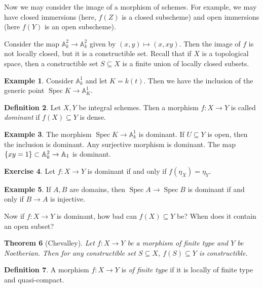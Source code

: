 \documentclass[leqno, openany]{memoir}
\newtheorem{thm}{Theorem}[section]
\theoremstyle{definition}
\newtheorem{defn}[thm]{Definition}
\newtheorem{exm}[thm]{Example}
\newtheorem{exer}[thm]{Exercise}
\theoremstyle{remark}
\theoremstyle{plain}
\theoremstyle{definition}
\theoremstyle{remark}
\newcommand{\A}{\mathbb{A}}
\DeclareMathOperator{\Spec}{Spec}
\begin{document}
Now we may consider the image of a morphism of schemes. For example, we may have closed immersions (here, $f(Z)$ is a closed subscheme) and open immersions (here $f(Y)$ is an open subscheme).

Consider the map $\A^2_k \to \A^2_k$ given by $(x,y) \mapsto (x, xy)$. Then the image of $f$ is not locally closed, but it is a constructible set. Recall that if $X$ is a topological space, then a constructible set $S \subseteq X$ is a finite union of locally closed subsets.

\begin{exm}
    Consider $\A^1_k$ and let $K = k(t)$. Then we have the inclusion of the generic point $\Spec K \to \A^1_K$.
\end{exm}

\begin{defn}
    Let $X,Y$ be integral schemes. Then a morphism $f \colon X \to Y$ is called \textit{dominant} if $f(X) \subseteq Y$ is dense.
\end{defn}

\begin{exm}
    The morphism $\Spec K \to \A^1_k$ is dominant. If $U \subseteq Y$ is open, then the inclusion is dominant. Any surjective morphism is dominant. The map $\qty{xy = 1} \subset \A^2_k \to \A_1$ is dominant.
\end{exm}

\begin{exer}
    Let $f \colon X \to Y$ is dominant if and only if $f(\eta_X) = \eta_Y$.
\end{exer}

\begin{exm}
    If $A, B$ are domains, then $\Spec A \to \Spec B$ is dominant if and only if $B \to A$ is injective.
\end{exm}

Now if $f \colon X \to Y$ is dominant, how bad can $f(X) \subseteq Y$ be? When does it contain an open subset?

\begin{thm}[Chevalley]
    Let $f \colon X \to Y$ be a morphism of finite type and $Y$ be Noetherian. Then for any constructible set $S \subseteq X$, $f(S) \subseteq Y$ is constructible.
\end{thm}

\begin{defn}
    A morphism $f \colon X \to Y$ is \textit{of finite type} if it is locally of finite type and quasi-compact.
\end{defn}
\end{document}
